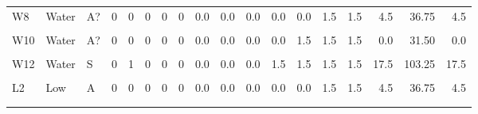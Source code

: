 \documentclass[12pt,final,CPage]{ufthesis}
\begin{document}
{\begin{table}
{\begin{tabular}[t]{lllrrrrrrrrrrrrrrr}
  W8 & Water & A? & 0 & 0 & 0 & 0 & 0 & 0.0 & 0.0 & 0.0 & 0.0 & 0.0 & 1.5 & 1.5 & 4.5 & 36.75 & 4.5\\
  \cellcolor{gray!6}{W9} & \cellcolor{gray!6}{Water} & \cellcolor{gray!6}{A} & \cellcolor{gray!6}{0} & \cellcolor{gray!6}{0} & \cellcolor{gray!6}{0} & \cellcolor{gray!6}{0} & \cellcolor{gray!6}{0} & \cellcolor{gray!6}{0.0} & \cellcolor{gray!6}{0.0} & \cellcolor{gray!6}{0.0} & \cellcolor{gray!6}{1.5} & \cellcolor{gray!6}{1.5} & \cellcolor{gray!6}{1.5} & \cellcolor{gray!6}{1.5} & \cellcolor{gray!6}{0.0} & \cellcolor{gray!6}{42.00} & \cellcolor{gray!6}{0.0}\\
  W10 & Water & A? & 0 & 0 & 0 & 0 & 0 & 0.0 & 0.0 & 0.0 & 0.0 & 1.5 & 1.5 & 1.5 & 0.0 & 31.50 & 0.0\\
  \addlinespace
  \cellcolor{gray!6}{W11} & \cellcolor{gray!6}{Water} & \cellcolor{gray!6}{A?} & \cellcolor{gray!6}{0} & \cellcolor{gray!6}{0} & \cellcolor{gray!6}{0} & \cellcolor{gray!6}{0} & \cellcolor{gray!6}{0} & \cellcolor{gray!6}{0.0} & \cellcolor{gray!6}{0.0} & \cellcolor{gray!6}{1.5} & \cellcolor{gray!6}{0.0} & \cellcolor{gray!6}{0.0} & \cellcolor{gray!6}{1.5} & \cellcolor{gray!6}{1.5} & \cellcolor{gray!6}{1.5} & \cellcolor{gray!6}{36.75} & \cellcolor{gray!6}{1.5}\\
  W12 & Water & S & 0 & 1 & 0 & 0 & 0 & 0.0 & 0.0 & 0.0 & 1.5 & 1.5 & 1.5 & 1.5 & 17.5 & 103.25 & 17.5\\
  \cellcolor{gray!6}{L1} & \cellcolor{gray!6}{Low} & \cellcolor{gray!6}{A} & \cellcolor{gray!6}{0} & \cellcolor{gray!6}{0} & \cellcolor{gray!6}{0} & \cellcolor{gray!6}{0} & \cellcolor{gray!6}{0} & \cellcolor{gray!6}{0.0} & \cellcolor{gray!6}{0.0} & \cellcolor{gray!6}{0.0} & \cellcolor{gray!6}{0.0} & \cellcolor{gray!6}{1.5} & \cellcolor{gray!6}{4.5} & \cellcolor{gray!6}{1.5} & \cellcolor{gray!6}{0.0} & \cellcolor{gray!6}{52.50} & \cellcolor{gray!6}{0.0}\\
  L2 & Low & A & 0 & 0 & 0 & 0 & 0 & 0.0 & 0.0 & 0.0 & 0.0 & 0.0 & 1.5 & 1.5 & 4.5 & 36.75 & 4.5\\
  \cellcolor{gray!6}{L3} & \cellcolor{gray!6}{Low} & \cellcolor{gray!6}{S} & \cellcolor{gray!6}{0} & \cellcolor{gray!6}{0} & \cellcolor{gray!6}{0} & \cellcolor{gray!6}{0} & \cellcolor{gray!6}{0} & \cellcolor{gray!6}{0.0} & \cellcolor{gray!6}{0.0} & \cellcolor{gray!6}{0.0} & \cellcolor{gray!6}{4.5} & \cellcolor{gray!6}{1.5} & \cellcolor{gray!6}{4.5} & \cellcolor{gray!6}{0.0} & \cellcolor{gray!6}{1.5} & \cellcolor{gray!6}{78.75} & \cellcolor{gray!6}{1.5}\\
  \addlinespace

\end{tabular}}
\end{table}}
\end{document}
